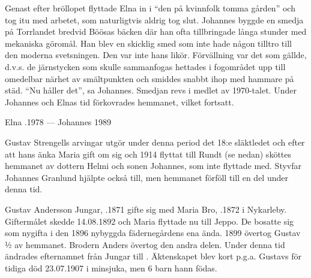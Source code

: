Genast efter bröllopet flyttade Elna  in i ``den på kvinnfolk tomma gården'' och tog itu med arbetet, som naturligtvis aldrig tog slut. Johannes byggde en smedja på Torrlandet bredvid Böösas bäcken där han ofta tillbringade långa stunder med mekaniska göromål. Han blev en skicklig smed som inte hade någon tilltro till  den moderna svetsningen. Den var inte hans likör. Förvällning var det som gällde, d.v.s. de järnstycken som skulle sammanfogas hettades i fogområdet upp till omedelbar närhet av smältpunkten och smiddes snabbt ihop med hammare på städ. ``Nu håller det'', sa Johannes. Smedjan revs i medlet av 1970-talet. Under Johannes och Elnas tid förkovrades hemmanet, vilket fortsatt.
\begin{jhchildren}
  \item {}
  \item {}
  \item {}
  \item {}
\end{jhchildren}

Elna .1978  ---  Johannes  1989


Gustav Strengells arvingar utgör under denna period det 18:e släktledet och efter att hans änka Maria gift om sig och 1914 flyttat till Rundt (se nedan) sköttes hemmanet av dottern Helmi och sonen Johannes, som inte flyttade med. Styvfar Johannes Granlund hjälpte också till, men hemmanet förföll till en del under denna tid.


Gustav Andersson Jungar, .1871 gifte sig med Maria Bro, .1872 i Nykarleby. Giftermålet skedde 14.08.1892 och Maria flyttade nu till Jeppo. De bosatte sig som nygifta i den 1896 nybyggda fädernegårdens ena ända. 1899 övertog Gustav ½ av hemmanet. Brodern Anders övertog den andra delen. Under denna tid ändrades efternamnet från Jungar till . Äktenskapet blev kort p.g.a. Gustavs för tidiga död 23.07.1907 i minsjuka, men 6 barn hann födas.
\begin{jhchildren}
  \item {}
  \item {}
  \item {}
  \item {}
  \item {}
  \item {}
\end{jhchildren}

